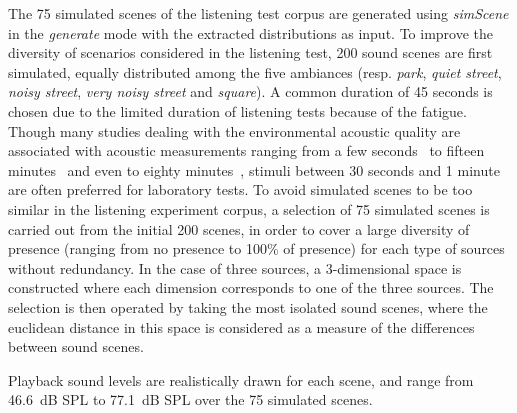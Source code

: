 \documentclass[twocolumn]{article}
\begin{document}
The 75 simulated scenes of the listening test corpus are generated using \textit{simScene} in the \textit{generate} mode with the extracted distributions as input. To improve the diversity of scenarios considered in the listening test, 200 sound scenes are first simulated, equally distributed among the five ambiances (resp. \textit{park}, \textit{quiet street}, \textit{noisy street}, \textit{very noisy street} and \textit{square}). A common duration of 45 seconds is chosen due to the limited duration of listening tests because of the fatigue. Though many studies dealing with the environmental acoustic quality are associated with acoustic measurements ranging from a few seconds~\cite{paulsen1997, brambilla2006} to fifteen minutes~\cite{kuwano1997, decoensel2007} and even to eighty minutes~\cite{namba1988}, stimuli between 30 seconds and 1 minute are often preferred for laboratory tests. To avoid simulated scenes to be too similar in the listening experiment corpus, a selection of 75 simulated scenes is carried out from the initial 200 scenes, in order to cover a large diversity of presence (ranging from no presence to 100\% of presence) for each type of sources without redundancy. In the case of three sources, a 3-dimensional space is constructed where each dimension corresponds to one of the three sources. The selection is then operated by taking the most isolated sound scenes, where the euclidean distance in this space is considered as a measure of the differences between sound scenes.

Playback sound levels are realistically drawn for each scene, and range from 46.6~dB SPL to 77.1~dB SPL over the 75 simulated scenes.
\end{document}
